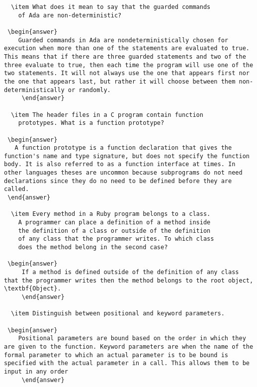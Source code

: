 \begin{enumerate}
\begin{answer}
\begin{lstlisting}
  \item What does it mean to say that the guarded commands
    of Ada are non-deterministic?

 \begin{answer}
    Guarded commands in Ada are nondeterministically chosen for execution when more than one of the statements are evaluated to true. This means that if there are three guarded statements and two of the three evaluate to true, then each time the program will use one of the two statements. It will not always use the one that appears first nor the one that appears last, but rather it will choose between them non-deterministically or randomly.
     \end{answer}

  \item The header files in a C program contain function
    prototypes. What is a function prototype?

 \begin{answer}
   A function prototype is a function declaration that gives the function's name and type signature, but does not specify the function body. It is also referred to as a function interface at times. In other languages theses are uncommon because subprograms do not need declarations since they do no need to be defined before they are called.
 \end{answer}

  \item Every method in a Ruby program belongs to a class.
    A programmer can place a definition of a method inside
    the definition of a class or outside of the definition
    of any class that the programmer writes. To which class
    does the method belong in the second case?

 \begin{answer}
     If a method is defined outside of the definition of any class that the programmer writes then the method belongs to the root object, \textbf{Object}.
     \end{answer}

  \item Distinguish between positional and keyword parameters.

 \begin{answer}
    Positional parameters are bound based on the order in which they are given to the function. Keyword parameters are when the name of the formal parameter to which an actual parameter is to be bound is specified with the actual parameter in a call. This allows them to be input in any order
     \end{answer}


\end{lstlisting}
\end{answer}
\end{enumerate}
